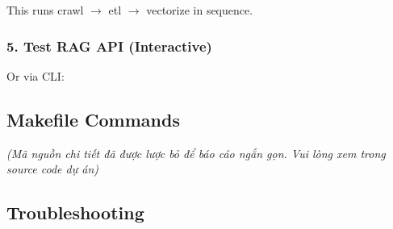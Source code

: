\begin{Shaded}
\begin{Highlighting}[]
\end{Highlighting}
\end{Shaded}

This runs crawl \(\rightarrow\) etl \(\rightarrow\) vectorize in
sequence.

\hypertarget{test-rag-api-interactive}{%
\subsubsection{5. Test RAG API
(Interactive)}}

\begin{Shaded}
\begin{Highlighting}[]
 

\end{Highlighting}
\end{Shaded}

Or via CLI:

\begin{Shaded}
\begin{Highlighting}[]
  
\end{Highlighting}
\end{Shaded}

\hypertarget{makefile-commands}{%
\subsection{Makefile Commands}}

\emph{(Mã nguồn chi tiết đã được lược bỏ để báo cáo ngắn gọn. Vui lòng
xem trong source code dự án)}

\hypertarget{troubleshooting}{%
\subsection{Troubleshooting}}

